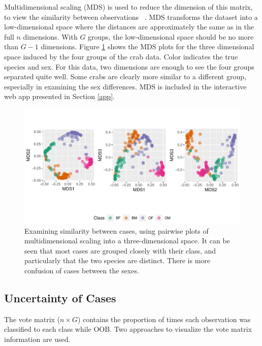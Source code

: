 \documentclass[smallextended,natbib]{svjour3}\usepackage[]{graphicx}\usepackage[]{xcolor}
\makeatletter
\def\maxwidth{ %
  \ifdim\Gin@nat@width>\linewidth
    \linewidth
  \else
    \Gin@nat@width
  \fi
}
\newenvironment{knitrout}{}{} %
\makeatother
\begin{document}
Multidimensional scaling (MDS) is used to reduce the dimension of this matrix, to view the similarity between observations ~\citep{kruskal1964multidimensional}. MDS transforms the dataset into a low-dimensional space where the distances are approximately the same as in the full $n$ dimensions. With $G$ groups, the low-dimensional space should be no more than $G-1$ dimensions. Figure \ref{prox1} shows the MDS plots for the three dimensional space induced by the four groups of the crab data. Color indicates the true species and sex. For this data, two dimensions are enough to see the four groups separated quite well. Some crabs are clearly more similar to a different group, especially in examining the sex differences. MDS is included in the interactive web app presented in Section \ref{app}.


\begin{figure}[hbpt]
\centering
\begin{knitrout}
\color{fgcolor}
\includegraphics[width=\maxwidth]{mds-1} 
\end{knitrout}
\caption{Examining similarity between cases, using pairwise plots of multidimensional scaling into a three-dimensional space. It can be seen that most cases are grouped closely with their class, and particularly that the two species are distinct. There is more confusion of cases between the sexes. \label{prox1}}
\end{figure}


\subsection{Uncertainty of Cases}

The vote matrix ($n \times G$) contains the proportion of times each observation was classified to each class while OOB. Two approaches to visualize the vote matrix information are used.
\end{document}
